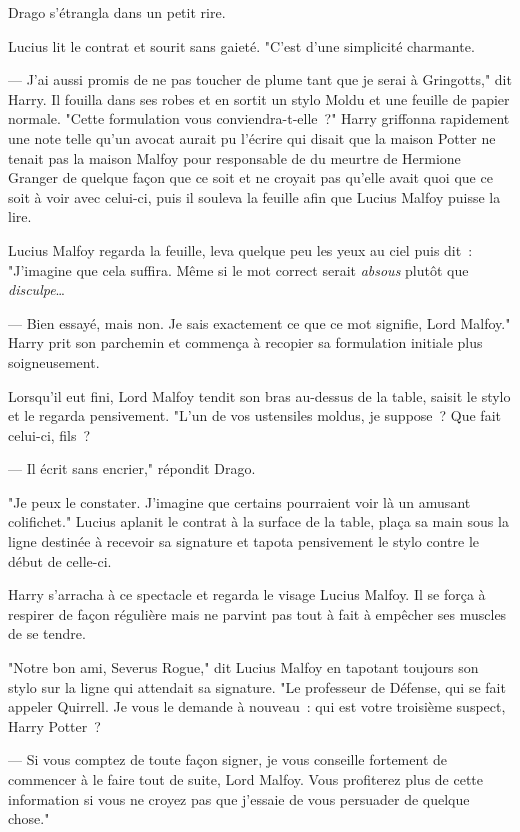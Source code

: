 Drago s'étrangla dans un petit rire.

Lucius lit le contrat et sourit sans gaieté. "C'est d'une simplicité charmante.

--- J'ai aussi promis de ne pas toucher de plume tant que je serai à Gringotts," dit Harry. Il fouilla dans ses robes et en sortit un stylo Moldu et une feuille de papier normale. "Cette formulation vous conviendra-t-elle~?" Harry griffonna rapidement une note telle qu'un avocat aurait pu l'écrire qui disait que la maison Potter ne tenait pas la maison Malfoy pour responsable de du meurtre de Hermione Granger de quelque façon que ce soit et ne croyait pas qu'elle avait quoi que ce soit à voir avec celui-ci, puis il souleva la feuille afin que Lucius Malfoy puisse la lire.

Lucius Malfoy regarda la feuille, leva quelque peu les yeux au ciel puis dit~: "J'imagine que cela suffira. Même si le mot correct serait \emph{absous} plutôt que \emph{disculpe}…

--- Bien essayé, mais non. Je sais exactement ce que ce mot signifie, Lord Malfoy." Harry prit son parchemin et commença à recopier sa formulation initiale plus soigneusement.

Lorsqu'il eut fini, Lord Malfoy tendit son bras au-dessus de la table, saisit le stylo et le regarda pensivement. "L'un de vos ustensiles moldus, je suppose~? Que fait celui-ci, fils~?

--- Il écrit sans encrier," répondit Drago.

"Je peux le constater. J'imagine que certains pourraient voir là un amusant colifichet." Lucius aplanit le contrat à la surface de la table, plaça sa main sous la ligne destinée à recevoir sa signature et tapota pensivement le stylo contre le début de celle-ci.

Harry s'arracha à ce spectacle et regarda le visage Lucius Malfoy. Il se força à respirer de façon régulière mais ne parvint pas tout à fait à empêcher ses muscles de se tendre.

"Notre bon ami, Severus Rogue," dit Lucius Malfoy en tapotant toujours son stylo sur la ligne qui attendait sa signature. "Le professeur de Défense, qui se fait appeler Quirrell. Je vous le demande à nouveau~: qui est votre troisième suspect, Harry Potter~?

--- Si vous comptez de toute façon signer, je vous conseille fortement de commencer à le faire tout de suite, Lord Malfoy. Vous profiterez plus de cette information si vous ne croyez pas que j'essaie de vous persuader de quelque chose."

